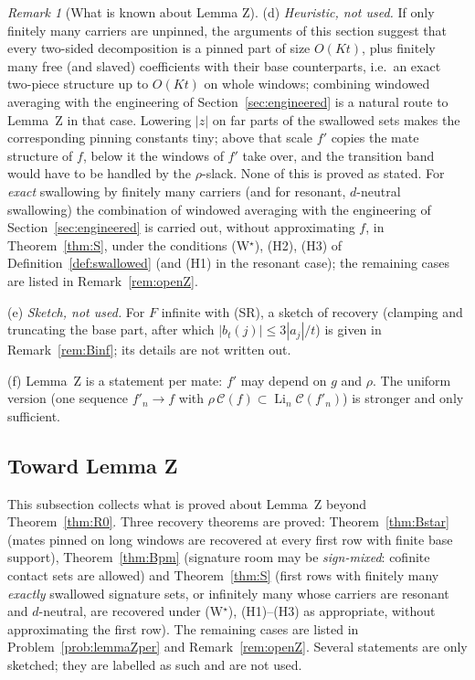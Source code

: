 \documentclass[10pt]{amsart}
\theoremstyle{definition}
\theoremstyle{remark}
\newtheorem{remark}[theorem]{Remark}
\newcommand{\Cset}{\mathcal C}
\newcommand{\Li}{\operatorname*{Li}}
\begin{document}
\begin{remark}[What is known about Lemma Z]
(d) \emph{Heuristic, not used.}  If only finitely many carriers are unpinned,
the arguments of this section suggest that every two-sided decomposition is a
pinned part of size $O(Kt)$, plus finitely many free (and slaved)
coefficients with their base counterparts, i.e.\ an exact two-piece
structure up to $O(Kt)$ on whole windows; combining windowed averaging with
the engineering of Section~\ref{sec:engineered} is a natural route to
Lemma~Z in that case.  Lowering $|z|$ on far parts of the swallowed sets
makes the corresponding pinning constants tiny; above that scale $f'$
copies the mate structure of $f$, below it the windows of $f'$ take over,
and the transition band would have to be handled by the $\rho$-slack.
None of this is proved as stated.  For \emph{exact} swallowing by finitely
many carriers (and for resonant, $d$-neutral swallowing) the combination
of windowed averaging with the engineering of
Section~\ref{sec:engineered} is carried out, without approximating $f$, in
Theorem~\ref{thm:S}, under the conditions \textup{(W$^\star$)},
\textup{(H2)}, \textup{(H3)} of Definition~\ref{def:swallowed} (and
\textup{(H1)} in the resonant case); the remaining cases are listed in
Remark~\ref{rem:openZ}.

(e) \emph{Sketch, not used.}  For $F$ infinite with (SR), a sketch of
recovery (clamping and truncating the base part, after which
$|b_t(j)|\le3|a_j|/t$) is given in Remark~\ref{rem:Binf}; its details are
not written out.

(f) Lemma~Z is a statement per mate: $f'$ may depend on $g$ and $\rho$.
The uniform version (one sequence $f'_n\to f$ with
$\rho\,\Cset(f)\subset\Li_n\Cset(f'_n)$) is stronger and only sufficient.
\end{remark}

\subsection{Toward Lemma Z}\label{subsec:towardZ}
This subsection collects what is proved about Lemma~Z beyond
Theorem~\ref{thm:R0}.  Three recovery theorems are proved:
Theorem~\ref{thm:Bstar} (mates pinned on long windows are recovered at
every first row with finite base support),
Theorem~\ref{thm:Bpm} (signature room may be \emph{sign-mixed}: cofinite
contact sets are allowed) and Theorem~\ref{thm:S} (first rows with
finitely many \emph{exactly} swallowed signature sets, or infinitely many
whose carriers are resonant and $d$-neutral, are recovered under
\textup{(W$^\star$)}, \textup{(H1)}--\textup{(H3)} as appropriate,
without approximating the first row).  The remaining cases are listed in
Problem~\ref{prob:lemmaZper} and Remark~\ref{rem:openZ}.  Several statements
are only sketched; they are labelled as such and are not used.
\end{document}
